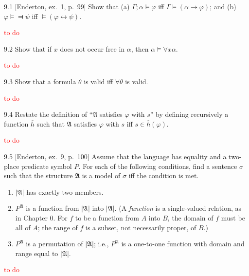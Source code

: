 
\begin{exercise}{9.1}
  [Enderton, ex.~1, p.~99]
  Show that (a) $\Gamma;\alpha\vDash \varphi$ iff $\Gamma\vDash(\alpha\to \varphi)$; and (b) $\varphi\vDash\Dashv \psi$ iff $\vDash(\varphi \leftrightarrow \psi).$
\end{exercise}

\textcolor{red}{to do}

\begin{exercise}{9.2}
  Show that if $x$ does not occur free in $\alpha$, then $\alpha\vDash\forall x \alpha$.
\end{exercise}

\textcolor{red}{to do}

\begin{exercise}{9.3}
  Show that a formula $\theta$ is valid iff $\forall\theta$ is valid.
\end{exercise}

\textcolor{red}{to do}

\begin{exercise}{9.4}
  Restate the definition of ``$\mathfrak{A}$ satisfies $\varphi$ with $s$'' by defining recursively a function $\overline{h}$ such that $\mathfrak{A}$ satisfies $\varphi$ with $s$ iff $s\in \overline{h}(\varphi).$
\end{exercise}

\textcolor{red}{to do}

\begin{exercise}{9.5}
  [Enderton, ex.~9, p.~100]
  Assume that the language has equality and a two-place predicate symbol $P$. For each of the following conditions, find a sentence $\sigma$ such that the structure $\mathfrak{A}$ is a model of $\sigma$ iff the condition is met.
  \begin{enumerate}[label=(\alph*)]
    \item $|\mathfrak{A}|$ has exactly two members.
    \item $P^{\mathfrak{A}}$ is a function from $|\mathfrak{A}|$ into $|\mathfrak{A}|$. (A \textit{function} is a single-valued relation, as in Chapter 0. For $f$ to be a function from $A$ into $B$, the domain of $f$ must be all of $A$; the range of $f$ is a subset, not necessarily proper, of $B$.)
    \item $P^{\mathfrak{A}}$ is a permutation of $|\mathfrak{A}|$; i.e., $P^{\mathfrak{A}}$ is a one-to-one function with domain and range equal to $|\mathfrak{A}|$.\qedhere
  \end{enumerate}
\end{exercise}

\textcolor{red}{to do}
